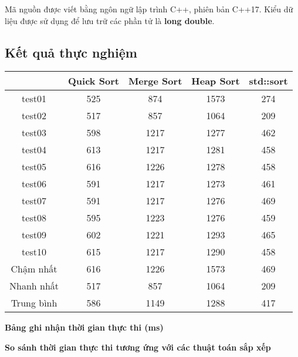 \documentclass[12pt]{report}
\begin{document}
	Mã nguồn được viết bằng ngôn ngữ lập trình C++, phiên bản C++17. Kiểu dữ liệu được sử dụng để lưu trữ các phần tử là \textbf{long double}.
	
	\subsection*{Kết quả thực nghiệm}
	
	\begin{center}
		
		\begin{tabular}{|c|c|c|c|c|}
			\hline
			& Quick Sort & Merge Sort & Heap Sort & std::sort \\
			\hline
			test01 & 525 & 874 & 1573 & 274 \\ 
			\hline
			test02 & 517 & 857 & 1064 & 209 \\ 
			\hline
			test03 & 598 & 1217& 1277 & 462 \\ 
			\hline
			test04 & 613 & 1217& 1281 & 458 \\ 
			\hline
			test05 & 616 & 1226& 1278 & 458 \\ 
			\hline
			test06 & 591 & 1217& 1273 & 461 \\ 
			\hline
			test07 & 591 & 1217& 1276 & 469 \\
			\hline
			test08 & 595 & 1223& 1276 & 459 \\ 
			\hline
			test09 & 602 & 1221& 1293 & 465 \\
			\hline
			test10 & 615 & 1217& 1290 & 458 \\
			\hline
			Chậm nhất & 616 & 1226 & 1573 & 469 \\
			\hline
			Nhanh nhất & 517 & 857 &1064 & 209 \\ 
			\hline
			Trung bình & 586 & 1149 &1288 & 417 \\
			\hline
		\end{tabular}
	
		\textbf{Bảng ghi nhận thời gian thực thi (ms)}
	\end{center}
	
	\begin{center}

	\textbf{So sánh thời gian thực thi tương ứng với các thuật toán sắp xếp}

	\end{center}
	
\end{document}
